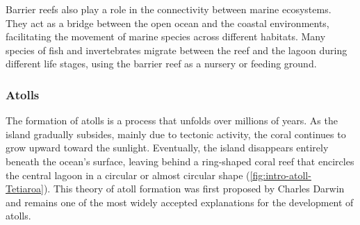 Barrier reefs also play a role in the connectivity between marine ecosystems. They act as a bridge between the open ocean and the coastal environments, facilitating the movement of marine species across different habitats. Many species of fish and invertebrates migrate between the reef and the lagoon during different life stages, using the barrier reef as a nursery or feeding ground.

\subsubsection{Atolls}
The formation of atolls is a process that unfolds over millions of years. As the island gradually subsides, mainly due to tectonic activity, the coral continues to grow upward toward the sunlight. Eventually, the island disappears entirely beneath the ocean's surface, leaving behind a ring-shaped coral reef that encircles the central lagoon in a circular or almost circular shape (\cref{fig:intro-atoll-Tetiaroa}). This theory of atoll formation was first proposed by Charles Darwin and remains one of the most widely accepted explanations for the development of atolls.




